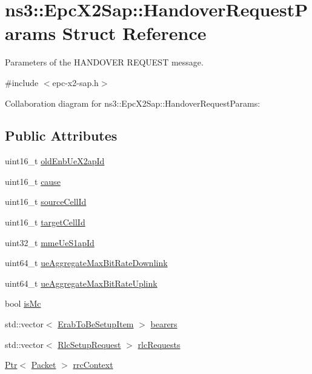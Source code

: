 \hypertarget{structns3_1_1EpcX2Sap_1_1HandoverRequestParams}{}\section{ns3\+:\+:Epc\+X2\+Sap\+:\+:Handover\+Request\+Params Struct Reference}
\label{structns3_1_1EpcX2Sap_1_1HandoverRequestParams}


Parameters of the H\+A\+N\+D\+O\+V\+ER R\+E\+Q\+U\+E\+ST message.  




{\ttfamily \#include $<$epc-\/x2-\/sap.\+h$>$}



Collaboration diagram for ns3\+:\+:Epc\+X2\+Sap\+:\+:Handover\+Request\+Params\+:
\subsection*{Public Attributes}
\begin{DoxyCompactItemize}
\item 
uint16\+\_\+t \hyperlink{structns3_1_1EpcX2Sap_1_1HandoverRequestParams_a0104f94d70c81945f8f07b6438ef4478}{old\+Enb\+Ue\+X2ap\+Id}
\item 
uint16\+\_\+t \hyperlink{structns3_1_1EpcX2Sap_1_1HandoverRequestParams_a7e821ab322cc3bee3e568d5b84b1a16c}{cause}
\item 
uint16\+\_\+t \hyperlink{structns3_1_1EpcX2Sap_1_1HandoverRequestParams_a6e46fa1c8104c2cea62e2e6ea4c73dfb}{source\+Cell\+Id}
\item 
uint16\+\_\+t \hyperlink{structns3_1_1EpcX2Sap_1_1HandoverRequestParams_a81dae779b7855e88137a6e5c729b1ca8}{target\+Cell\+Id}
\item 
uint32\+\_\+t \hyperlink{structns3_1_1EpcX2Sap_1_1HandoverRequestParams_aa5fcce19140eb9ddff4941a7bfeee294}{mme\+Ue\+S1ap\+Id}
\item 
uint64\+\_\+t \hyperlink{structns3_1_1EpcX2Sap_1_1HandoverRequestParams_a6844d9529081a0a1c3b2317c5ec47a14}{ue\+Aggregate\+Max\+Bit\+Rate\+Downlink}
\item 
uint64\+\_\+t \hyperlink{structns3_1_1EpcX2Sap_1_1HandoverRequestParams_a73b26a46b6dfa2ab871d33a81ea6c100}{ue\+Aggregate\+Max\+Bit\+Rate\+Uplink}
\item 
bool \hyperlink{structns3_1_1EpcX2Sap_1_1HandoverRequestParams_aff0f31c90bf6a32aa63471cf0d6d377e}{is\+Mc}
\item 
std\+::vector$<$ \hyperlink{structns3_1_1EpcX2Sap_1_1ErabToBeSetupItem}{Erab\+To\+Be\+Setup\+Item} $>$ \hyperlink{structns3_1_1EpcX2Sap_1_1HandoverRequestParams_ab4114d8416ea81259d590aeb17dc91a8}{bearers}
\item 
std\+::vector$<$ \hyperlink{structns3_1_1EpcX2Sap_1_1RlcSetupRequest}{Rlc\+Setup\+Request} $>$ \hyperlink{structns3_1_1EpcX2Sap_1_1HandoverRequestParams_ad17dde7ea2916a848b2e18571dc1206d}{rlc\+Requests}
\item 
\hyperlink{classns3_1_1Ptr}{Ptr}$<$ \hyperlink{classns3_1_1Packet}{Packet} $>$ \hyperlink{structns3_1_1EpcX2Sap_1_1HandoverRequestParams_a83aed4c75e9e2dc51428e63f3b3d6f14}{rrc\+Context}
\end{DoxyCompactItemize}


